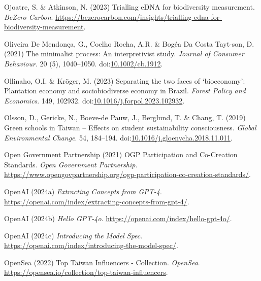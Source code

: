 \documentclass[
  letterpaper,
  DIV=11,
  numbers=noendperiod]{scrartcl}
\newlength{\cslhangindent}
\newenvironment{CSLReferences}[2] %
 {\begin{list}{}{%
  \setlength{\itemindent}{0pt}
  \setlength{\leftmargin}{0pt}
  \setlength{\parsep}{0pt}
  \ifodd #1
   \setlength{\leftmargin}{\cslhangindent}
   \setlength{\itemindent}{-1\cslhangindent}
  \fi
  \setlength{\itemsep}{#2\baselineskip}}}
 {\end{list}}
\begin{document}
\begin{CSLReferences}{0}{1}
Ojoatre, S. \& Atkinson, N. (2023) Trialling {eDNA} for biodiversity
measurement. \emph{BeZero Carbon}.
\url{https://bezerocarbon.com/insights/trialling-edna-for-biodiversity-measurement}.

Oliveira De Mendonça, G., Coelho Rocha, A.R. \& Bogéa Da Costa Tayt-son,
D. (2021) The minimalist process: {An} interpretivist study.
\emph{Journal of Consumer Behaviour}. 20 (5), 1040--1050.
doi:\href{https://doi.org/10.1002/cb.1912}{10.1002/cb.1912}.

Ollinaho, O.I. \& Kröger, M. (2023) Separating the two faces of
{`bioeconomy'}: {Plantation} economy and sociobiodiverse economy in
{Brazil}. \emph{Forest Policy and Economics}. 149, 102932.
doi:\href{https://doi.org/10.1016/j.forpol.2023.102932}{10.1016/j.forpol.2023.102932}.

Olsson, D., Gericke, N., Boeve-de Pauw, J., Berglund, T. \& Chang, T.
(2019) Green schools in {Taiwan} -- {Effects} on student sustainability
consciousness. \emph{Global Environmental Change}. 54, 184--194.
doi:\href{https://doi.org/10.1016/j.gloenvcha.2018.11.011}{10.1016/j.gloenvcha.2018.11.011}.

Open Government Partnership (2021) {OGP Participation} and {Co-Creation
Standards}. \emph{Open Government Partnership}.
\url{https://www.opengovpartnership.org/ogp-participation-co-creation-standards/}.

OpenAI (2024a) \emph{Extracting {Concepts} from {GPT-4}}.
\url{https://openai.com/index/extracting-concepts-from-gpt-4/}.

OpenAI (2024b) \emph{Hello {GPT-4o}}.
\url{https://openai.com/index/hello-gpt-4o/}.

OpenAI (2024c) \emph{Introducing the {Model Spec}}.
\url{https://openai.com/index/introducing-the-model-spec/}.

OpenSea (2022) Top {Taiwan Influencers} - {Collection}. \emph{OpenSea}.
\url{https://opensea.io/collection/top-taiwan-influencers}.


\end{CSLReferences}
\end{document}
